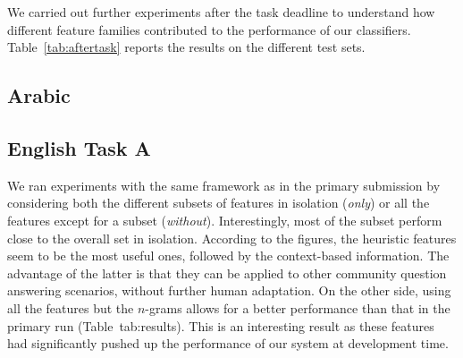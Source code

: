 We carried out further experiments after the task deadline to understand how 
different feature families contributed to the performance of our classifiers. 
Table~\ref{tab:aftertask} reports the results on the 
different test sets.





\subsection{Arabic} \label{sec:discussionArabic}



\subsection{English Task A} \label{sec:discussiona}

We ran experiments with the same framework as in the primary submission by 
considering both the different subsets of features in isolation (\textit{only}) 
or all the features except for a subset (\textit{without}). Interestingly, most 
of the subset perform close to the overall set in isolation. According to the 
figures, the heuristic features seem to be the most useful ones, followed by the 
context-based information. The advantage of the latter is that they can be 
applied to other community question answering scenarios, without further human 
adaptation. On the other side, using all the features but the $n$-grams allows 
for a better performance than that in the primary run (\cf Table~{tab:results}). 
This is an interesting result as these features had significantly pushed up the 
performance of our system at development time. 
 

